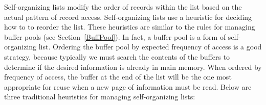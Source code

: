 Self-organizing lists modify the order of records within the
list based on the actual pattern of record access.
Self-organizing lists use a heuristic for
deciding how to to reorder the list.
These heuristics are similar to the rules for managing buffer
pools (see Section~\ref{BuffPool}).
In fact, a buffer pool is a form of self-organizing
list.
Ordering the buffer pool by expected frequency of access is a good
strategy, because typically we must search the contents of the buffers
to determine if the desired information is already in main memory.
When ordered by frequency of access, the buffer at the end of the
list will be the one most appropriate for reuse when a new page
of information must be read.
Below are three traditional heuristics for managing self-organizing
lists:

